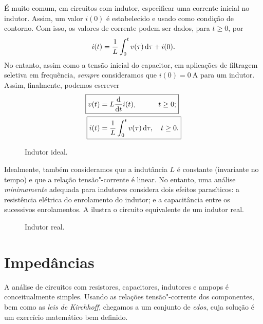 É muito comum, em circuitos com indutor, especificar uma corrente inicial no indutor. Assim, um valor $i(0)$ é estabelecido e usado como condição de contorno. Com isso, os valores de corrente podem ser dados, para $t\geq0$, por
\begin{equation*}
	i(t)=\frac{1}{L}\intd{v(\tau)}{\tau}{0}{t}+i(0).
\end{equation*}
No entanto, assim como a tensão inicial do capacitor, em aplicações de filtragem seletiva em frequência, \emph{sempre} consideramos que $i(0)=\qty{0}{\ampere}$ para um indutor. Assim, finalmente, podemos escrever
\begin{align}\label{eq:vL}
	\Aboxed{v(t)&=L\diff{i(t)}{t},\qquad\quad t\geq0;}\\\label{eq:iL}
	\Aboxed{i(t)&=\frac{1}{L}\intd{v(\tau)}{\tau}{0}{t},\quad t\geq0.}
\end{align}

\begin{figure}
	\centering
	\caption{Indutor ideal.}
	\label{fig:indutor}
\end{figure}

Idealmente, também consideramos que a indutância $L$ é constante (invariante no tempo) e que a relação tensão"-corrente é linear. No entanto, uma análise \emph{minimamente} adequada para indutores considera dois efeitos parasíticos: a resistência elétrica do enrolamento do indutor; e a capacitância entre os sucessivos enrolamentos. A  ilustra o circuito equivalente de um indutor real.

\begin{figure}
	\centering
	\caption{Indutor real.}
	\label{fig:indutorReal}
\end{figure}

\section{Impedâncias}
A análise de circuitos com resistores, capacitores, indutores e \acp{ampop} é conceitualmente simples. Usando as relações tensão"-corrente dos componentes, bem como as \emph{leis de Kirchhoff}, chegamos a um conjunto de \emph{\acp{edo}}, cuja solução é um exercício matemático bem definido.

